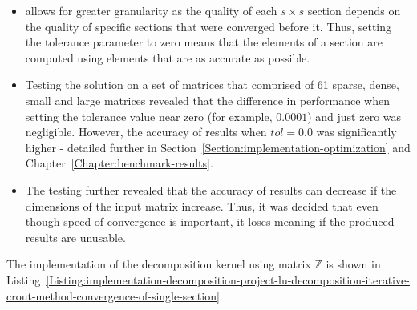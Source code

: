 \begin{itemize}
	\item \textit{} allows for greater granularity as the quality of each $ s \times s $ section depends on the quality of specific sections that were converged before it. Thus, setting the tolerance parameter to zero means that the elements of a section are computed using elements that are as accurate as possible.
	\item Testing the solution on a set of matrices that comprised of 61 sparse, dense, small and large matrices revealed that the difference in performance when setting the tolerance value near zero (for example, $ 0.0001 $) and just zero was negligible. However, the accuracy of results when $ tol = 0.0 $ was significantly higher - detailed further in Section~\ref{Section:implementation-optimization} and Chapter~\ref{Chapter:benchmark-results}.
	\item The testing further revealed that the accuracy of results can decrease if the dimensions of the input matrix increase. Thus, it was decided that even though speed of convergence is important, it loses meaning if the produced results are unusable.
\end{itemize}

The implementation of the decomposition kernel using matrix $ \mathbb{Z} $ is shown in Listing~\ref{Listing:implementation-decomposition-project-lu-decomposition-iterative-crout-method-convergence-of-single-section}.

